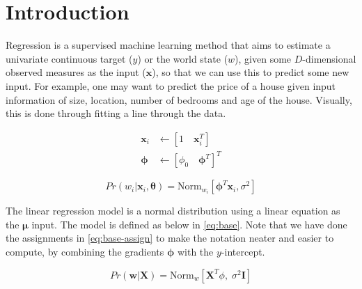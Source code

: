 \documentclass[11pt,openright,a4paper]{article}
\numberwithin{equation}{section}
\begin{document}


\section{Introduction} \label{sec:intro}
Regression is a supervised machine learning method that aims to estimate a univariate continuous target ($y$) or the world state ($w$), given some $D$-dimensional observed measures as the input ({$\mathbf{x}$}), so that we can use this to predict some new input. For example, one may want to predict the price of a house given input information of size, location, number of bedrooms and age of the house. Visually, this is done through fitting a line through the data.

\begin{equation} \label{eq:base-assign}
    \begin{aligned}
        \mathbf{x}_i &\leftarrow \left [ 1 \quad \mathbf{x}_{i}^{T}  \right ] \\
        \mathbf{\phi} &\leftarrow \left [ \phi_0 \quad \boldsymbol\phi^T \right ]^T
    \end{aligned}
\end{equation}

\begin{equation} \label{eq:base}
    Pr \left( w_i | \mathbf{x}_i, \boldsymbol\theta \right) = \text{Norm}_{w_i} \left [ \boldsymbol\phi^T \mathbf{x}_i, \sigma^2 \right ]
\end{equation}

The linear regression model is a normal distribution using a linear equation as the $\boldsymbol\mu$ input. The model is defined as below in \autoref{eq:base}. Note that we have done the assignments in \autoref{eq:base-assign} to make the notation neater and easier to compute, by combining the gradients $\boldsymbol\phi$ with the $y$-intercept.


\begin{equation} \label{eq:base-all}
    Pr \left( \mathbf{w} | \mathbf{X} \right) = 
    \text{Norm}_w \left [ \mathbf{X}^T \phi, \; \sigma^2\mathbf{I} \right ]
\end{equation}
\end{document}
